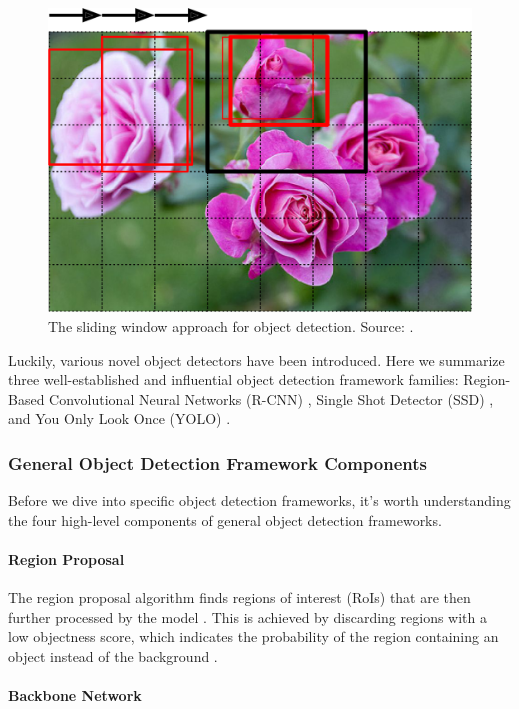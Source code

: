 \documentclass[a4paper, 11pt, oneside]{article}
\begin{document}
\begin{figure}[ht]
  \begin{center}
    \includegraphics[width=.5\textwidth]{sliding_window.png}
  \end{center}
  \caption{The sliding window approach for object detection. Source: \cite{o2019deep}.}
\end{figure}

Luckily, various novel object detectors have been introduced. Here we summarize three well-established and influential
object detection framework families: Region-Based Convolutional Neural Networks (R-CNN)
\cite{girshick2014rich, girshick2015fast, ren2015faster}, Single Shot Detector (SSD) \cite{liu2016ssd}, and You Only
Look Once (YOLO) \cite{redmon2016you, redmon2017yolo9000, redmon2018yolov3, bochkovskiy2020yolov4, yolov5}.

\subsubsection{General Object Detection Framework Components}

\label{sec:generalobjectdetection}

Before we dive into specific object detection frameworks, it's worth understanding the four high-level components of
general object detection frameworks.

\paragraph{Region Proposal}

The region proposal algorithm finds regions of interest (RoIs) that are then further processed by the model
\cite{elgendy2020deep}. This is achieved by discarding regions with a low objectness score, which indicates the probability
of the region containing an object instead of the background \cite{elgendy2020deep}.

\paragraph{Backbone Network}
\end{document}
